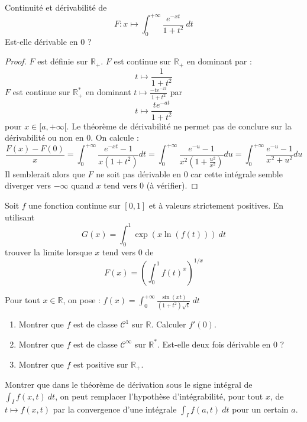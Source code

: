 \documentclass[french,a4paper]{article}
\newcommand{\R}{\mathbb{R}}
\newcommand{\st}{^*}
\theoremstyle{plain}
\theoremstyle{definition}
\theoremstyle{remark}
\begin{document}
\begin{ex}[Moulin.IP.23]{}
	Continuité et dérivabilité de $$F:x\mapsto\int_{0}^{+\infty}\frac{e^{-xt}}{1+t^2}\ dt$$ Est-elle dérivable en $0$ ?
\end{ex}
\begin{proof}
	$F$ est définie sur $\R_+$. $F$ est continue sur $\R_+$ en dominant par : $$t\mapsto\frac{1}{1+t^2}$$ $F$ est continue sur $\R_+\st$ en dominant $t\mapsto\displaystyle\frac{-te^{-xt}}{1+t^2}$ par $$t\mapsto\frac{te^{-at}}{1+t^2}$$ pour $x\in[a,+\infty[$. Le théorème de dérivabilité ne permet pas de conclure sur la dérivabilité ou non en $0$. On calcule : $$\frac{F(x)-F(0)}{x}=\int_{0}^{+\infty}\frac{e^{-xt}-1}{x(1+t^2)}dt=\int_{0}^{+\infty}\frac{e^{-u}-1}{x^2\left(1+\frac{u^2}{x^2}\right)}du=\int_{0}^{+\infty}\frac{e^{-u}-1}{x^2+u^2}du$$ Il semblerait alors que $F$ ne soit pas dérivable en $0$ car cette intégrale semble diverger vers $-\infty$ quand $x$ tend vers $0$ (à vérifier).
\end{proof}

\begin{ex}[Moulin.IP.24]{}
	Soit $f$ une fonction continue sur $[0,1]$ et à valeurs strictement positives. En utilisant $$G(x)=\int_{0}^{1}\exp(x\ln(f(t)))\ dt$$ trouver la limite lorsque $x$ tend vers $0$ de $$F(x)=\left(\int_{0}^{1}f(t)^x\right)^{1/x}$$
\end{ex}

\begin{ex}[Moulin.IP.25]{}
	Pour tout $x\in\R$, on pose : $f(x)=\displaystyle\int_{0}^{+\infty}\frac{\sin(xt)}{(1+t^2)\sqrt{t}}\ dt$
	\begin{enumerate}
		\item Montrer que $f$ est de classe $\mathcal{C}^1$ sur $\R$. Calculer $f'(0)$.
		\item Montrer que $f$ est de classe $\mathcal{C}^\infty$ sur $\R\st$. Est-elle deux fois dérivable en $0$ ?
		\item Montrer que $f$ est positive sur $\R_+$.
	\end{enumerate}
\end{ex}

\begin{ex}[Moulin.IP.26]{}
	Montrer que dans le théorème de dérivation sous le signe intégral de $\displaystyle\int_If(x,t)\ dt$, on peut remplacer l'hypothèse d'intégrabilité, pour tout $x$, de $t\mapsto f(x,t)$ par la convergence d'une intégrale $\displaystyle\int_I f(a,t)\ dt$ pour un certain $a$.
\end{ex}
\end{document}
